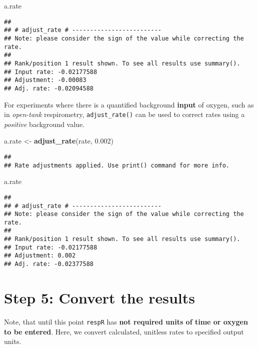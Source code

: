\documentclass[]{book}
\newenvironment{Shaded}{\begin{snugshade}}{\end{snugshade}}
\newcommand{\KeywordTok}[1]{\textcolor[rgb]{0.13,0.29,0.53}{\textbf{#1}}}
\newcommand{\FloatTok}[1]{\textcolor[rgb]{0.00,0.00,0.81}{#1}}
\newcommand{\StringTok}[1]{\textcolor[rgb]{0.31,0.60,0.02}{#1}}
\newcommand{\NormalTok}[1]{#1}
\begin{document}
\begin{Shaded}
\begin{Highlighting}[]
\NormalTok{a.rate}
\end{Highlighting}
\end{Shaded}

\begin{verbatim}
## 
## # adjust_rate # -------------------------
## Note: please consider the sign of the value while correcting the rate.
## 
## Rank/position 1 result shown. To see all results use summary().
## Input rate: -0.02177588
## Adjustment: -0.00083
## Adj. rate: -0.02094588
\end{verbatim}

For experiments where there is a quantified background \textbf{input} of
oxygen, such as in \emph{open-tank} respirometry,
\texttt{adjust\_rate()} can be used to correct rates using a
\emph{positive} background value.

\begin{Shaded}
\begin{Highlighting}[]
\NormalTok{a.rate <-}\StringTok{ }\KeywordTok{adjust_rate}\NormalTok{(rate, }\FloatTok{0.002}\NormalTok{)}
\end{Highlighting}
\end{Shaded}

\begin{verbatim}
## 
## Rate adjustments applied. Use print() command for more info.
\end{verbatim}

\begin{Shaded}
\begin{Highlighting}[]
\NormalTok{a.rate}
\end{Highlighting}
\end{Shaded}

\begin{verbatim}
## 
## # adjust_rate # -------------------------
## Note: please consider the sign of the value while correcting the rate.
## 
## Rank/position 1 result shown. To see all results use summary().
## Input rate: -0.02177588
## Adjustment: 0.002
## Adj. rate: -0.02377588
\end{verbatim}

\section{Step 5: Convert the results}\label{step-5-convert-the-results}

Note, that until this point \texttt{respR} has \textbf{not required
units of time or oxygen to be entered}. Here, we convert calculated,
unitless rates to specified output units.
\end{document}
